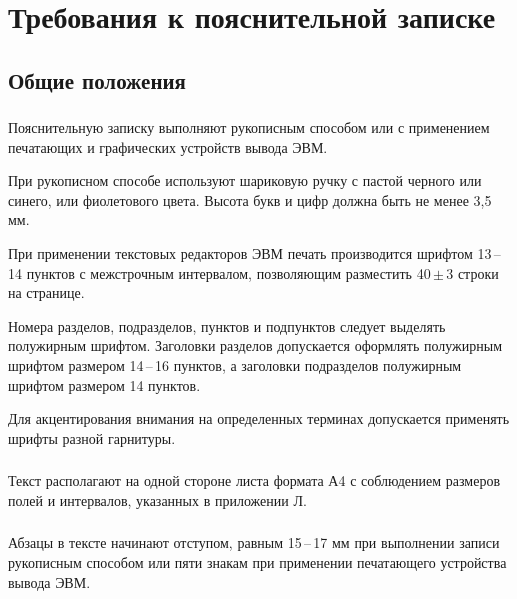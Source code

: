







\section{Требования к пояснительной записке}

\subsection{Общие положения}

\subsubsection{} 
Пояснительную  записку  выполняют  рукописным  способом  или  с применением печатающих и графических устройств вывода ЭВМ. 

При рукописном способе используют шариковую ручку с пастой черного или синего, или фиолетового цвета. Высота букв и цифр должна быть не менее 3,5 мм. 

При применении текстовых редакторов ЭВМ печать производится шрифтом 13\,--\,14  пунктов  с  межстрочным  интервалом,  позволяющим  разместить  
40\,\( \pm \)\,3 строки на странице. 

Номера  разделов,  подразделов,  пунктов и подпунктов следует выделять полужирным  шрифтом.  Заголовки  разделов  допускается  оформлять  полужирным шрифтом размером 14\,--\,16 пунктов, а заголовки подразделов полужирным шрифтом размером 14 пунктов. 

Для  акцентирования  внимания  на  определенных  терминах  допускается применять шрифты разной гарнитуры. 

\subsubsection{}
Текст располагают на одной стороне листа формата А4 с соблюдением размеров полей и интервалов, указанных в приложении Л.

\subsubsection{}
Абзацы в тексте начинают отступом, равным 15\,--\,17 мм при выполнении  записи  рукописным  способом  или  пяти  знакам  при  применении  печатающего устройства вывода ЭВМ.

